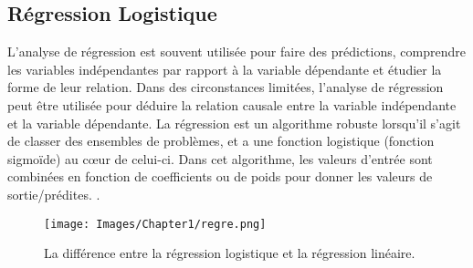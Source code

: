 \subsection{Régression Logistique}
L'analyse de régression est souvent utilisée pour faire des prédictions, comprendre les variables indépendantes par rapport à la variable dépendante et étudier la forme de leur relation.
Dans des circonstances limitées, l'analyse de régression peut être utilisée pour déduire la relation causale entre la variable indépendante et la variable dépendante.
La régression est un algorithme robuste lorsqu'il s'agit de classer des ensembles de problèmes, et a une fonction logistique (fonction sigmoïde) au cœur de celui-ci. Dans cet algorithme, les valeurs d'entrée sont combinées en fonction de coefficients ou de poids pour donner les valeurs de sortie/prédites. \cite{7}.
\begin{figure}[h]
    \centering
    \texttt{[image: Images/Chapter1/regre.png]}
    \caption{La différence entre la régression logistique et la régression linéaire.}
    \label{fig:04}
    \end{figure} 
